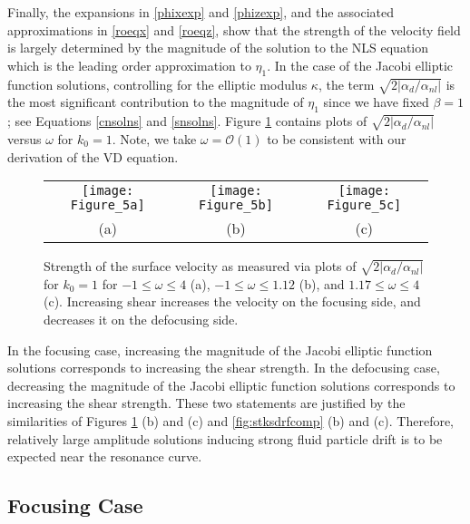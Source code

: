 \documentclass{JFM_Style/jfm}
\begin{document}
Finally, the expansions in \eqref{phixexp} and \eqref{phizexp}, and the associated approximations in \eqref{roeqx} and \eqref{roeqz}, show that the strength of the velocity field is largely determined by the magnitude of the solution to the NLS equation which is the leading order approximation to $\eta_{1}$.  In the case of the Jacobi elliptic function solutions, controlling for the elliptic modulus $\kappa$, the term $\sqrt{2|\alpha_{d}/\alpha_{nl}|}$ is the most significant contribution to the magnitude of $\eta_{1}$ since we have fixed $\beta=1$; see Equations \eqref{cnsolns} and \eqref{snsolns}.  Figure \ref{fig:ampcomps} contains plots of $\sqrt{2|\alpha_{d}/\alpha_{nl}|}$ versus $\omega$ for $k_0=1$.  Note, we take $\omega = \mathcal{O}(1)$ to be consistent with our derivation of the VD equation.
\begin{figure}
\centering
\begin{tabular}{ccc}
\texttt{[image: Figure\_5a]} & \texttt{[image: Figure\_5b]} & \texttt{[image: Figure\_5c]}\\
(a) & (b) & (c)
\end{tabular}
\caption{\small Strength of the surface velocity as measured via plots of $\sqrt{2|\alpha_{d}/\alpha_{nl}|}$ for $k_{0}=1$ for $-1\leq \omega \leq 4$ (a), $-1\leq \omega \leq 1.12$ (b), and $1.17\leq \omega \leq 4$ (c).  Increasing shear increases the velocity on the focusing side, and decreases it on the defocusing side.}
\label{fig:ampcomps}
\end{figure}
In the focusing case, increasing the magnitude of the Jacobi elliptic function solutions corresponds to increasing the shear strength.  In the defocusing case, decreasing the magnitude of the Jacobi elliptic function solutions corresponds to increasing the shear strength.  These two statements are justified by the similarities of Figures \ref{fig:ampcomps} (b) and (c) and \ref{fig:stksdrfcomp} (b) and (c).  Therefore, relatively large amplitude solutions inducing strong fluid particle drift is to be expected near the resonance curve.
\subsection{Focusing Case}
\end{document}
